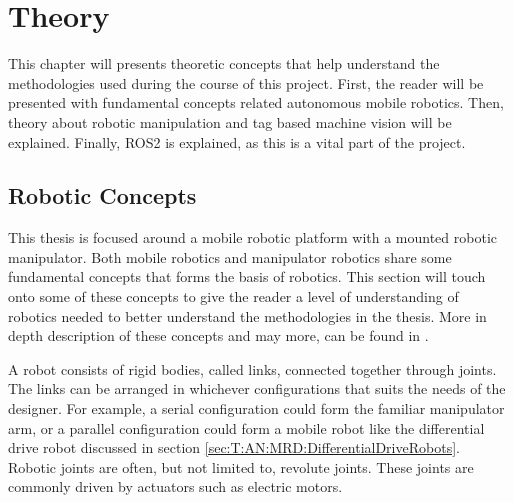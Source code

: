 \chapter{Theory}
This chapter will presents theoretic concepts that help understand the methodologies used during the course of this project. First, the reader will be presented with fundamental concepts related autonomous mobile robotics. Then, theory about robotic manipulation and tag based machine vision will be explained. Finally, ROS2 is explained, as this is a vital part of the project.


\section{Robotic Concepts}
This thesis is focused around a mobile robotic platform with a mounted robotic manipulator. Both mobile robotics and manipulator robotics share some fundamental concepts that forms the basis of robotics. This section will touch onto some of these concepts to give the reader a level of understanding of robotics needed to better understand the methodologies in the thesis. More in depth description of these concepts and may more, can be found in \cite{LynchKevin2017Mr:m}.

A robot consists of rigid bodies, called links, connected together through joints. The links can be arranged in whichever configurations that suits the needs of the designer. For example, a serial configuration could form the familiar manipulator arm, or a parallel configuration could form a mobile robot like the differential drive robot discussed in section \ref{sec:T:AN:MRD:DifferentialDriveRobots}. Robotic joints are often, but not limited to, revolute joints. These joints are commonly driven by actuators such as electric motors.

